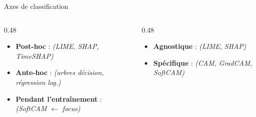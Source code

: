 \documentclass[10pt]{beamer}
\begin{document}
\begin{frame}{Axes de classification}
	\begin{columns}
		\begin{column}{0.48\textwidth}
			\begin{tcolorbox}[
				colback=blue!3,
				colframe=blue!40!black,
				arc=2mm,
				boxrule=0.5pt,
				fonttitle=\bfseries,
				title={Axe 1 --- Quand ?}
				]
				\begin{itemize}
					\item \textbf{Post-hoc} : \textit{(LIME, SHAP, TimeSHAP)}
					\item \textbf{Ante-hoc} : \textit{(arbres décision, régression log.)}
					\item \textbf{Pendant l'entraînement} : \textit{(SoftCAM $\leftarrow$ focus)}
				\end{itemize}
			\end{tcolorbox}
		\end{column}
		\begin{column}{0.48\textwidth}
			\begin{tcolorbox}[
				colback=green!3,
				colframe=green!40!black,
				arc=2mm,
				boxrule=0.5pt,
				fonttitle=\bfseries,
				title={Axe 2 --- Qui ?}
				]
				\begin{itemize}
					\item \textbf{Agnostique} : \textit{(LIME, SHAP)}
					\item \textbf{Spécifique} : \textit{(CAM, GradCAM, SoftCAM)}
				\end{itemize}
			\end{tcolorbox}
		\end{column}
	\end{columns}
	
	\vspace{10pt}
	

\end{frame}
\end{document}
